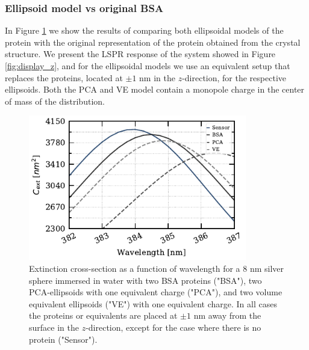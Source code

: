 \subsubsection{Ellipsoid model vs original BSA}\label{sssec:ell_mod_comp}

In Figure \ref{fig:2pz_ell_resp} we show the results of comparing both ellipsoidal models of the protein with the 
original representation of the protein obtained from the crystal structure. We present the LSPR response 
of the system showed in Figure \ref{fig:display_z}, and for the ellipsoidal models we use an equivalent 
setup that replaces the proteins, located at $\pm 1$ nm in the $z$-direction, for the respective ellipsoids.
Both the PCA and VE model contain a monopole charge in the center of mass of the distribution.

\begin{figure} %
    \centering
    \includegraphics[width=0.85\textwidth]{two_ell_analysis.pdf} 
    \caption{Extinction cross-section as a function of wavelength for a 8 nm silver sphere immersed 
    in water with two BSA proteins ("BSA"), two PCA-ellipsoids with one equivalent charge ("PCA"), and two
    volume equivalent ellipsoids ("VE") with one equivalent charge. In all cases the proteins or equivalents
    are placed at $\pm 1$ nm away from the surface in the $z$-direction, except for the case where there is 
    no protein ("Sensor").}
    \label{fig:2pz_ell_resp}
 \end{figure}

